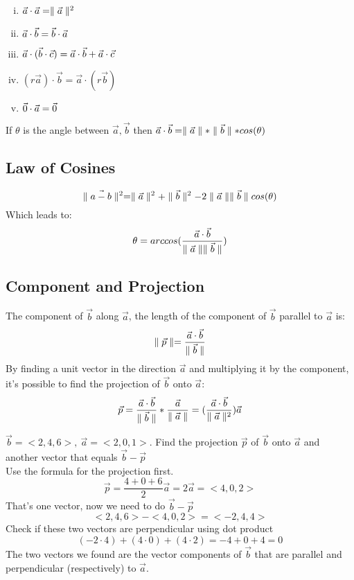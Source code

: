 \documentclass[12 pt]{article}
\begin{document}
		\begin{enumerate}[i)]
			\item $\vec{a}\cdot\vec{a}=\parallel \vec{a} \parallel^2$
			\item $\vec{a}\cdot\vec{b}=\vec{b}\cdot\vec{a}$
			\item $\vec{a}\cdot (\vec{b}\cdot\vec{c})=\vec{a}\cdot\vec{b}+\vec{a}\cdot\vec{c}$
			\item $(r\vec{a})\cdot\vec{b}=\vec{a}\cdot(r\vec{b})$
			\item $\vec{0}\cdot\vec{a}=\vec{0}$
		\end{enumerate}
		\begin{thrm}
			If $\theta$ is the angle between $\vec{a},\vec{b}$ then $\vec{a}\cdot\vec{b}=\parallel\vec{a}\parallel*\parallel\vec{b}\parallel *cos(\theta)$
		\end{thrm}

		\subsection{Law of Cosines}

		$$\parallel \vec{a-b} \parallel^2=\parallel \vec{a} \parallel^2+\parallel \vec{b} \parallel^2-2\parallel \vec{a} \parallel\parallel \vec{b} \parallel cos(\theta)$$
		Which leads to:\\
		$$\theta=arccos(\frac{\vec{a}\cdot\vec{b}}{\parallel \vec{a} \parallel\parallel \vec{b} \parallel})$$

		\subsection{Component and Projection}

		The component of $\vec{b}$ along $\vec{a}$, the length of the component of $\vec{b}$ parallel to $\vec{a}$ is:
		$$\parallel \vec{p} \parallel=\frac{\vec{a}\cdot\vec{b}}{\parallel \vec{b} \parallel}$$
		By finding a unit vector in the direction $\vec{a}$ and multiplying it by the component, it's possible to find the projection of $\vec{b}$ onto $\vec{a}$:
		$$\vec{p}=\frac{\vec{a}\cdot\vec{b}}{\parallel \vec{b} \parallel}*\frac{\vec{a}}{\parallel \vec{a} \parallel}=(\frac{\vec{a}\cdot\vec{b}}{\parallel \vec{a} \parallel^2})\vec{a}$$

		\begin{exmp*}
			$\vec{b}=<2,4,6>,\ \vec{a}=<2,0,1>$. Find the projection $\vec{p}$ of $\vec{b}$ onto $\vec{a}$ and another vector that equals $\vec{b}-\vec{p}$\\
			Use the formula for the projection first.
			$$\vec{p}=\frac{4+0+6}{2}\vec{a}=2\vec{a}=<4,0,2>$$
			That's one vector, now we need to do $\vec{b}-\vec{p}$
			$$<2,4,6>-<4,0,2>=<-2,4,4>$$
			Check if these two vectors are perpendicular using dot product
			$$(-2\cdot 4)+(4\cdot 0)+(4\cdot 2)=-4+0+4=0$$
			The two vectors we found are the vector components of $\vec{b}$ that are parallel and perpendicular (respectively) to $\vec{a}$.
		\end{exmp*}
\end{document}
